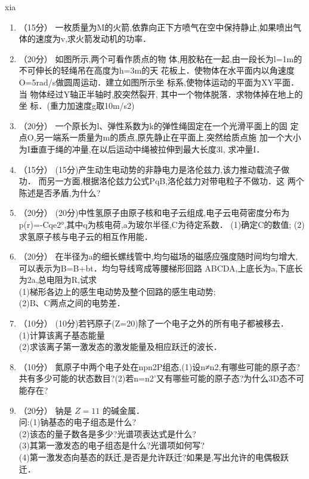 
\begin{issues}
\issueTODO
xia
\end{issues}


\begin{enumerate}
\item （15分）
一枚质量为M的火箭,依靠向正下方喷气在空中保持静止,如果喷出气体的速度为v,求火箭发动机的功率．
\item （20分）
如图所示,两个可看作质点的物
体,用胶粘在一起,由一段长为l=1m的
不可伸长的轻绳吊在高度为h=3m的天
花板上．使物体在水平面内以角速度
O=5rad/s做圆周运动．建立如图所示坐
标系,使物体运动的平面为XY平面．当
物体经过Y轴正半轴时,胶突然裂开,
其中一个物体脱落．求物体掉在地上的坐
标．(重力加速度g取10m/s2)
\item （20分）
一个原长为l、弹性系数为k的弹性绳固定在一个光滑平面上的固
定点O,另一端系一质量为m的质点,原先静止在平面上,突然给质点施
加一个大小为I垂直于绳的冲量,在以后运动中绳被拉伸到最大长度3l,
求冲量I．
\item （15分）
(15分)产生动生电动势的非静电力是洛伦兹力,该力推动载流子做功．
而另一方面,根据洛伦兹力公式PqB,洛伦兹力对带电粒子不做功．这
两个陈述是否矛盾,为什么?
\item （20分）
(20分)中性氢原子由原子核和电子云组成,电子云电荷密度分布为
p(r)=-Cqe2°,其中q为核电荷,a为玻尔半径,C为待定系数．
(1)确定C的数值;
(2)求氢原子核与电子云的相互作用能．
\item （20分）
在半径为a的细长螺线管中,均匀磁场的磁感应强度随时间均匀增大,可以表示为B=B+bt．均匀导线弯成等腰梯形回路 ABCDA,上底长为a,下底长为2a,总电阻为R,试求\\
(1)梯形各边上的感生电动势及整个回路的感生电动势;\\
(2)B、C两点之间的电势差．
\item （10分）
(10分)若钙原子(Z=20)除了一个电子之外的所有电子都被移去．\\
(1)计算该离子基态能量\\
(2)求该离子第一激发态的激发能量及相应跃迁的波长．
\item （10分）
氮原子中两个电子处在npn2P组态,(1)设n≠n2,有哪些可能的原子态?共有多少可能的状态数目?(2)若n=n2’又有哪些可能的原子态?为什么3D态不可能存在?
\item （20分） 
钠是 $Z=11$ 的碱金属．\\问:(1)钠基态的电子组态是什么?\\(2)该态的量子数各是多少?光谱项表达式是什么?\\(3)其第一激发态的电子组态是什么?光谱项如何写?\\(4)第一激发态向基态的跃迁,是否是允许跃迁?如果是,写出允许的电偶极跃迁．
\end{enumerate}